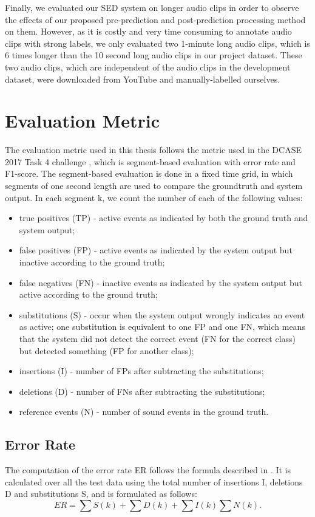 Finally, we evaluated our SED system on longer audio clips in order to observe the effects of our proposed pre-prediction and post-prediction processing method on them. However, as it is costly and very time consuming to annotate audio clips with strong labels, we only evaluated two 1-minute long audio clips, which is 6 times longer than the 10 second long audio clips in our project dataset. These two audio clips, which are independent of the audio clips in the development dataset, were downloaded from YouTube and manually-labelled ourselves.

\section{Evaluation Metric}
The evaluation metric used in this thesis follows the metric used in the DCASE 2017 Task 4 challenge \cite{DCASE2017}, which is segment-based evaluation with error rate and F1-score. The segment-based evaluation is done in a fixed time grid, in which segments of one second length are used to compare the groundtruth and system output. In each segment k, we count the number of each of the following values:
\begin{itemize}

\item{true positives (TP) - active events as indicated by both the ground truth and system output;}
\item{false positives (FP) - active events as indicated by the system output but inactive according to the ground truth;}
\item{false negatives (FN) - inactive events as indicated by the system output but active according to the ground truth;} 
\item{substitutions (S) - occur when the system output wrongly indicates an event as active; one substitution is equivalent to one FP and one FN, which means that the system did not detect the correct event (FN for the correct class) but detected something (FP for another class);}
\item{insertions (I) - number of FPs after subtracting the substitutions;}
\item{deletions (D) - number of FNs after subtracting the substitutions;}
\item{reference events (N) - number of sound events in the ground truth.}

\end{itemize}

\subsection{Error Rate}
The computation of the error rate ER follows the formula described in \cite{Poliner2007}. It is calculated over all the test data using the total number of insertions I, deletions D and substitutions S, and is formulated as follows:
\begin{equation}
ER = \sum{S(k)} + \sum{D(k)} + \sum{I(k)}\sum{N(k)}.    
\end{equation}

